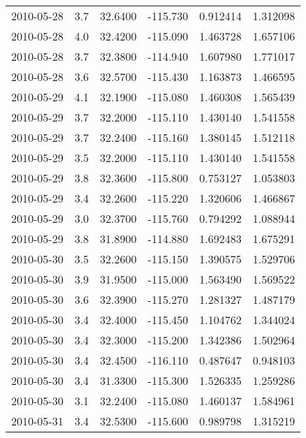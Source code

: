 \begin{tabular}{lrrrrr}
2010-05-28 &       3.7 &  32.6400 &  -115.730 &         0.912414 &         1.312098 \\
2010-05-28 &       4.0 &  32.4200 &  -115.090 &         1.463728 &         1.657106 \\
2010-05-28 &       3.7 &  32.3800 &  -114.940 &         1.607980 &         1.771017 \\
2010-05-28 &       3.6 &  32.5700 &  -115.430 &         1.163873 &         1.466595 \\
2010-05-29 &       4.1 &  32.1900 &  -115.080 &         1.460308 &         1.565439 \\
2010-05-29 &       3.7 &  32.2000 &  -115.110 &         1.430140 &         1.541558 \\
2010-05-29 &       3.7 &  32.2400 &  -115.160 &         1.380145 &         1.512118 \\
2010-05-29 &       3.5 &  32.2000 &  -115.110 &         1.430140 &         1.541558 \\
2010-05-29 &       3.8 &  32.3600 &  -115.800 &         0.753127 &         1.053803 \\
2010-05-29 &       3.4 &  32.2600 &  -115.220 &         1.320606 &         1.466867 \\
2010-05-29 &       3.0 &  32.3700 &  -115.760 &         0.794292 &         1.088944 \\
2010-05-29 &       3.8 &  31.8900 &  -114.880 &         1.692483 &         1.675291 \\
2010-05-30 &       3.5 &  32.2600 &  -115.150 &         1.390575 &         1.529706 \\
2010-05-30 &       3.9 &  31.9500 &  -115.000 &         1.563490 &         1.569522 \\
2010-05-30 &       3.6 &  32.3900 &  -115.270 &         1.281327 &         1.487179 \\
2010-05-30 &       3.4 &  32.4000 &  -115.450 &         1.104762 &         1.344024 \\
2010-05-30 &       3.4 &  32.3000 &  -115.200 &         1.342386 &         1.502964 \\
2010-05-30 &       3.4 &  32.4500 &  -116.110 &         0.487647 &         0.948103 \\
2010-05-30 &       3.4 &  31.3300 &  -115.300 &         1.526335 &         1.259286 \\
2010-05-30 &       3.1 &  32.2400 &  -115.080 &         1.460137 &         1.584961 \\
2010-05-31 &       3.4 &  32.5300 &  -115.600 &         0.989798 &         1.315219 \\

\end{tabular}
